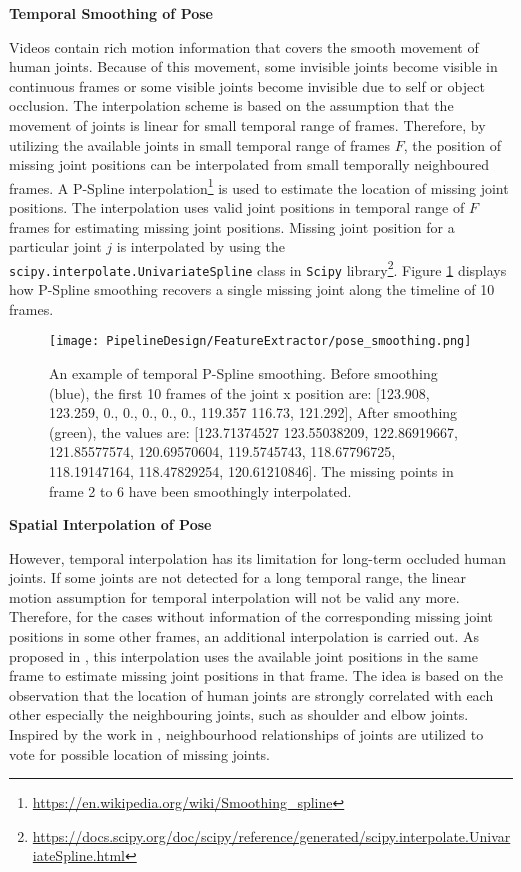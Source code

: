 \textbf{Temporal Smoothing of Pose}

Videos contain rich motion information that covers the smooth movement of human joints. Because of this movement, some invisible joints become visible in continuous frames or some visible joints become invisible due to self or object occlusion. The interpolation scheme is based on the assumption that the movement of joints is linear for small temporal range of frames. Therefore, by utilizing the available joints in small temporal range of frames $F$, the position of missing joint positions can be interpolated from small temporally neighboured frames. A P-Spline interpolation\footnote{\url{https://en.wikipedia.org/wiki/Smoothing_spline}} is used to estimate the location of missing joint positions. The interpolation uses valid joint positions in temporal range of $F$ frames for estimating missing joint positions. Missing joint position for a particular joint $j$ is interpolated by using the \texttt{scipy.interpolate.UnivariateSpline} class in \texttt{Scipy} library\footnote{\url{https://docs.scipy.org/doc/scipy/reference/generated/scipy.interpolate.UnivariateSpline.html}}. Figure \ref{fig:pose_smoothing} displays how P-Spline smoothing recovers a single missing joint along the timeline of 10 frames.  

\begin{figure}[h!]
  \centering
  \texttt{[image: PipelineDesign/FeatureExtractor/pose\_smoothing.png]}
  \caption{An example of temporal P-Spline smoothing. Before smoothing (blue), the first 10 frames of 
           the joint x position are: [123.908, 123.259, 0., 0., 0., 0., 0., 119.357 116.73, 121.292],  
           After smoothing (green), the values are: [123.71374527 123.55038209, 122.86919667,
           121.85577574, 120.69570604, 119.5745743, 118.67796725, 118.19147164, 118.47829254,
           120.61210846]. The missing points in frame 2 to 6 have been smoothingly interpolated.}
  \label{fig:pose_smoothing}
\end{figure} 

\textbf{Spatial Interpolation of Pose}

However, temporal interpolation has its limitation for long-term occluded human joints. If some joints are not detected for a long temporal range, the linear motion assumption for temporal interpolation will not be valid any more. Therefore, for the cases without information of the corresponding missing joint positions in some other frames, an additional interpolation is carried out. As proposed in \cite{usman2018}, this interpolation uses the available joint positions in the same frame to estimate missing joint positions in that frame. The idea is based on the observation that the location of human joints are strongly correlated with each other especially the neighbouring joints, such as shoulder and elbow joints. Inspired by the work in \cite{Muller2010}, neighbourhood relationships of joints are utilized to vote for possible location of missing joints. 

